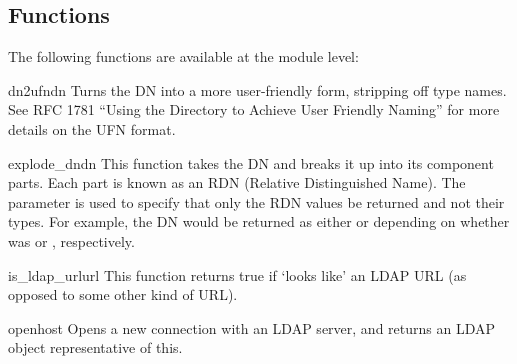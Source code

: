 

\subsection{Functions}

The following functions are available at the module level:


\begin{funcdesc}[string]{dn2ufn}{dn}
Turns the DN  into a more user-friendly form, stripping off type names.
See RFC 1781 ``Using the Directory to Achieve User Friendly Naming''
for more details on the UFN format.
\end{funcdesc}


\begin{funcdesc}[list]{explode_dn}{dn }
This function takes the DN  and breaks it up into its component parts. 
Each part is known as an RDN (Relative Distinguished Name). The
 parameter is used to specify that only the RDN values be returned
and not their types. For example, the DN  would be
returned as either \code{["cn=Bob", "c=US"]} or \code{["Bob","US"]}
depending on whether  was  or , respectively.
\end{funcdesc}


\begin{funcdesc}[boolean]{is_ldap_url}{url}
This function returns true if  `looks like' an LDAP URL 
(as opposed to some other kind of URL). 
\end{funcdesc}


\begin{funcdesc}[LDAPObject]{open}{host }
Opens a new connection with an LDAP server, and returns an LDAP object
representative of this.
\end{funcdesc}
